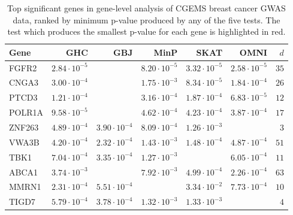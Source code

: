 \documentclass[12pt]{article}
\def\red{\color{red}}
\begin{document}
\begin{table}[ht]
\caption{Top significant genes in gene-level analysis of CGEMS breast cancer GWAS data, ranked by minimum p-value produced by any of the five tests. The test which produces the smallest p-value for each gene is highlighted in red. }
\begin{center}
\begin{tabular}{lrrrrrr}
   \hline
Gene & GHC & GBJ & MinP & SKAT & OMNI & $d$ \\ 
  \hline
FGFR2 & $2.84\cdot10^{-5}$ & \red{$4.58\cdot10^{-6}$} & $8.20\cdot10^{-5}$ & $3.32\cdot10^{-5}$ & $2.58\cdot10^{-5}$ & $35$ \\ 
  CNGA3 & $3.00\cdot10^{-4}$ & \red{$4.04\cdot10^{-5}$} & $1.75\cdot10^{-3}$ & $8.34\cdot10^{-5}$ & $1.84\cdot10^{-4}$ & $26$ \\ 
  PTCD3 & $1.21\cdot10^{-4}$ & \red{$5.50\cdot10^{-5}$} & $3.16\cdot10^{-4}$ & $1.87\cdot10^{-4}$ & $6.83\cdot10^{-5}$ & $12$ \\ 
  POLR1A & $9.58\cdot10^{-5}$ & \red{$6.19\cdot10^{-5}$} & $4.62\cdot10^{-4}$ & $4.23\cdot10^{-4}$ & $3.87\cdot10^{-4}$ & $17$ \\ 
  ZNF263 & $4.89\cdot10^{-4}$ & $3.90\cdot10^{-4}$ & $8.09\cdot10^{-4}$ & $1.26\cdot10^{-3}$ & \red{$6.84\cdot10^{-5}$} & $3$ \\ 
  VWA3B & $4.20\cdot10^{-4}$ & $2.32\cdot10^{-4}$ & $1.43\cdot10^{-3}$ & $1.48\cdot10^{-4}$ & $4.87\cdot10^{-4}$ & $51$ \\ 
  TBK1 & $7.04\cdot10^{-4}$ & $3.35\cdot10^{-4}$ & $1.27\cdot10^{-3}$ & \red{$1.48\cdot10^{-4}$} & $6.05\cdot10^{-4}$ & $11$ \\ 
  ABCA1 & $3.74\cdot10^{-3}$ & \red{$1.65\cdot10^{-4}$} & $7.92\cdot10^{-3}$ & $4.99\cdot10^{-4}$ & $2.26\cdot10^{-4}$ & $63$ \\ 
  MMRN1 & $2.31\cdot10^{-4}$ & $5.51\cdot10^{-4}$ & \red{$1.72\cdot10^{-4}$} & $3.34\cdot10^{-2}$ & $7.73\cdot10^{-4}$ & $10$ \\ 
  TIGD7 & $5.79\cdot10^{-4}$ & $3.78\cdot10^{-4}$ & $1.32\cdot10^{-3}$ & $1.33\cdot10^{-3}$ & \red{$2.05\cdot10^{-4}$} & $4$ \\ 
   \hline
   \end{tabular}
   \end{center}
\label{p2_tab:CGEMS_table}
\end{table}
\end{document}
